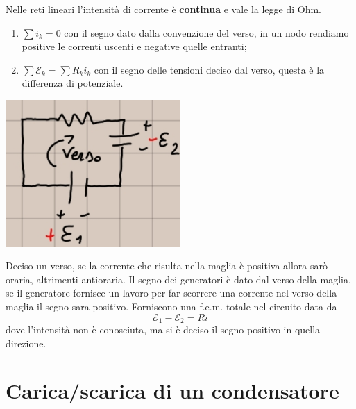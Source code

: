 \documentclass[a4paper, 12pt]{book}
\theoremstyle{plain}
\begin{document}
Nelle reti lineari l'intensità di corrente è \textbf{continua} e vale la legge di Ohm.
\begin{enumerate}
    \item $\sum i_k = 0$ con il segno dato dalla convenzione del verso, in un nodo rendiamo positive le correnti uscenti e negative quelle entranti;
    \item $\sum \mathcal{E}_k = \sum R_k i_k $ con il segno delle tensioni deciso dal verso, questa è la differenza di potenziale.
\end{enumerate}
\begin{center}
    \includegraphics[width=0.5\textwidth]{segno.jpg}
\end{center}
Deciso un verso, se la corrente che risulta nella maglia è 
positiva allora sarò oraria, altrimenti antioraria. Il 
segno dei generatori è dato dal verso della maglia, se il 
generatore fornisce un lavoro per far scorrere una corrente 
nel verso della maglia il segno sara positivo. Forniscono 
una f.e.m. totale nel circuito data da \[ \mathcal{E}_1 - \mathcal{E}_2 = Ri \]
dove l'intensità non è conosciuta, ma si è deciso il segno positivo 
in quella direzione.

\section{Carica/scarica di un condensatore}
\end{document}
